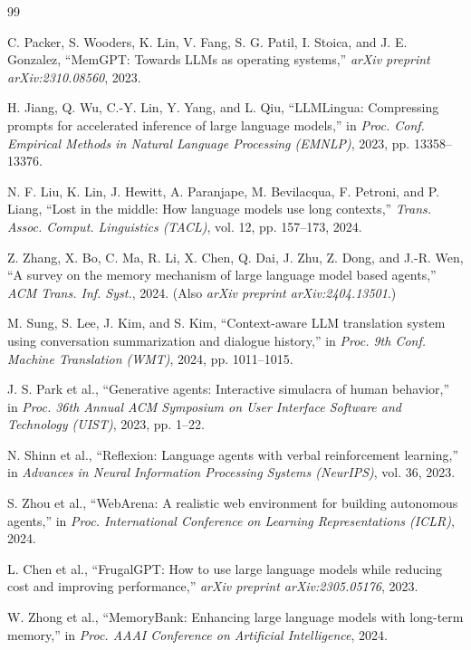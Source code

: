 \documentclass[conference]{IEEEtran}
\begin{document}
\begin{thebibliography}{99}

C. Packer, S. Wooders, K. Lin, V. Fang, S. G. Patil, I. Stoica, and J. E. Gonzalez, ``MemGPT: Towards LLMs as operating systems,'' \textit{arXiv preprint arXiv:2310.08560}, 2023.

H. Jiang, Q. Wu, C.-Y. Lin, Y. Yang, and L. Qiu, ``LLMLingua: Compressing prompts for accelerated inference of large language models,'' in \textit{Proc. Conf. Empirical Methods in Natural Language Processing (EMNLP)}, 2023, pp. 13358--13376.

N. F. Liu, K. Lin, J. Hewitt, A. Paranjape, M. Bevilacqua, F. Petroni, and P. Liang, ``Lost in the middle: How language models use long contexts,'' \textit{Trans. Assoc. Comput. Linguistics (TACL)}, vol. 12, pp. 157--173, 2024.

Z. Zhang, X. Bo, C. Ma, R. Li, X. Chen, Q. Dai, J. Zhu, Z. Dong, and J.-R. Wen, ``A survey on the memory mechanism of large language model based agents,'' \textit{ACM Trans. Inf. Syst.}, 2024. (Also \textit{arXiv preprint arXiv:2404.13501}.)

M. Sung, S. Lee, J. Kim, and S. Kim, ``Context-aware LLM translation system using conversation summarization and dialogue history,'' in \textit{Proc. 9th Conf. Machine Translation (WMT)}, 2024, pp. 1011--1015.

J. S. Park et al., ``Generative agents: Interactive simulacra of human behavior,'' in \textit{Proc. 36th Annual ACM Symposium on User Interface Software and Technology (UIST)}, 2023, pp. 1--22.

N. Shinn et al., ``Reflexion: Language agents with verbal reinforcement learning,'' in \textit{Advances in Neural Information Processing Systems (NeurIPS)}, vol. 36, 2023.

S. Zhou et al., ``WebArena: A realistic web environment for building autonomous agents,'' in \textit{Proc. International Conference on Learning Representations (ICLR)}, 2024.

L. Chen et al., ``FrugalGPT: How to use large language models while reducing cost and improving performance,'' \textit{arXiv preprint arXiv:2305.05176}, 2023.

W. Zhong et al., ``MemoryBank: Enhancing large language models with long-term memory,'' in \textit{Proc. AAAI Conference on Artificial Intelligence}, 2024.


\end{thebibliography}
\end{document}

